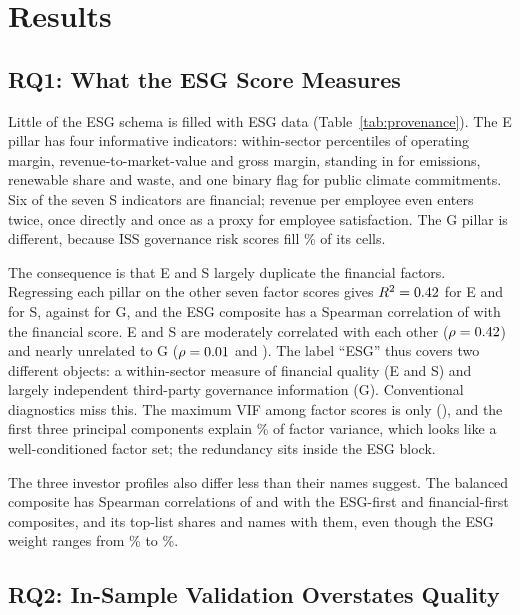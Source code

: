 \section{Results}
\label{sec:results}

\subsection{RQ1: What the ESG Score Measures}
\label{sec:res_construct}

Little of the ESG schema is filled with ESG data (Table~\ref{tab:provenance}).
The E pillar has four informative indicators: within-sector percentiles of
operating margin, revenue-to-market-value and gross margin, standing in for
emissions, renewable share and waste, and one binary flag for public climate
commitments. Six of the seven S indicators are financial; revenue per
employee even enters twice, once directly and once as a proxy for employee
satisfaction. The G pillar is different, because ISS governance risk scores
fill \ISSShareG\% of its cells.

The consequence is that E and S largely duplicate the financial factors.
Regressing each pillar on the other seven factor scores gives $R^2=0.42$
for E and \RSqS for S, against \RSqG for G, and the ESG composite has a
Spearman correlation of \RhoESGFin with the financial score. E and S are
moderately correlated with each other ($\rho=0.42$) and nearly unrelated
to G ($\rho=0.01$ and \RhoSG). The label ``ESG'' thus covers two different
objects: a within-sector measure of financial quality (E and S) and largely
independent third-party governance information (G). Conventional diagnostics
miss this. The maximum VIF among factor scores is only \VIFMax
(\VIFMaxFactor), and the first three principal components explain
\PCAFirstThree\% of factor variance, which looks like a well-conditioned
factor set; the redundancy sits inside the ESG block.

The three investor profiles also differ less than their names suggest. The
balanced composite has Spearman correlations of \RhoProfEB and \RhoProfBF
with the ESG-first and financial-first composites, and its top-\TopN list
shares \OverlapEB and \OverlapBF names with them, even though the ESG weight
ranges from \WFinFirstESG\% to \WESGFirstESG\%.

\subsection{RQ2: In-Sample Validation Overstates Quality}
\label{sec:res_insample}

